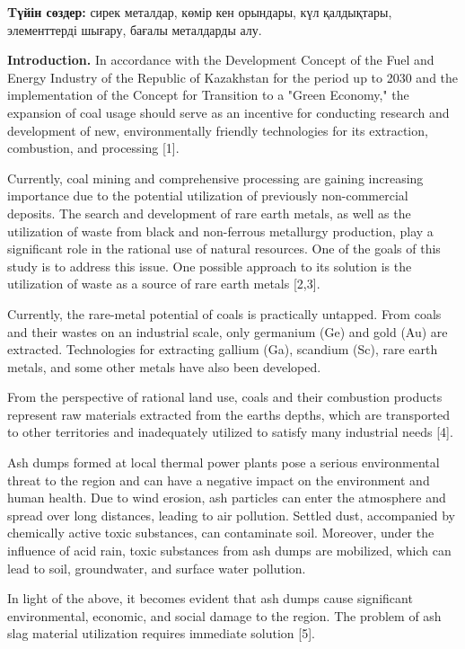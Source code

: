 {\bfseries Tүйін сөздер:} сирек металдар, көмір кен орындары, күл
қалдықтары, элементтерді шығару, бағалы металдарды алу.

\begin{multicols}{2}
{\bfseries Introduction.} In accordance with the Development Concept of the
Fuel and Energy Industry of the Republic of Kazakhstan for the period up
to 2030 and the implementation of the Concept for Transition to a "Green
Economy," the expansion of coal usage should serve as an incentive for
conducting research and development of new, environmentally friendly
technologies for its extraction, combustion, and processing {[}1{]}.

Currently, coal mining and comprehensive processing are gaining
increasing importance due to the potential utilization of previously
non-commercial deposits. The search and development of rare earth
metals, as well as the utilization of waste from black and non-ferrous
metallurgy production, play a significant role in the rational use of
natural resources. One of the goals of this study is to address this
issue. One possible approach to its solution is the utilization of waste
as a source of rare earth metals {[}2,3{]}.

Currently, the rare-metal potential of coals is practically untapped.
From coals and their wastes on an industrial scale, only germanium (Ge)
and gold (Au) are extracted. Technologies for extracting gallium (Ga),
scandium (Sc), rare earth metals, and some other metals have also been
developed.

From the perspective of rational land use, coals and their combustion
products represent raw materials extracted from the
earth\textquotesingle s depths, which are transported to other
territories and inadequately utilized to satisfy many industrial needs
{[}4{]}.

Ash dumps formed at local thermal power plants pose a serious
environmental threat to the region and can have a negative impact on the
environment and human health. Due to wind erosion, ash particles can
enter the atmosphere and spread over long distances, leading to air
pollution. Settled dust, accompanied by chemically active toxic
substances, can contaminate soil. Moreover, under the influence of acid
rain, toxic substances from ash dumps are mobilized, which can lead to
soil, groundwater, and surface water pollution.

In light of the above, it becomes evident that ash dumps cause
significant environmental, economic, and social damage to the region.
The problem of ash slag material utilization requires immediate solution
{[}5{]}.


\end{multicols}
